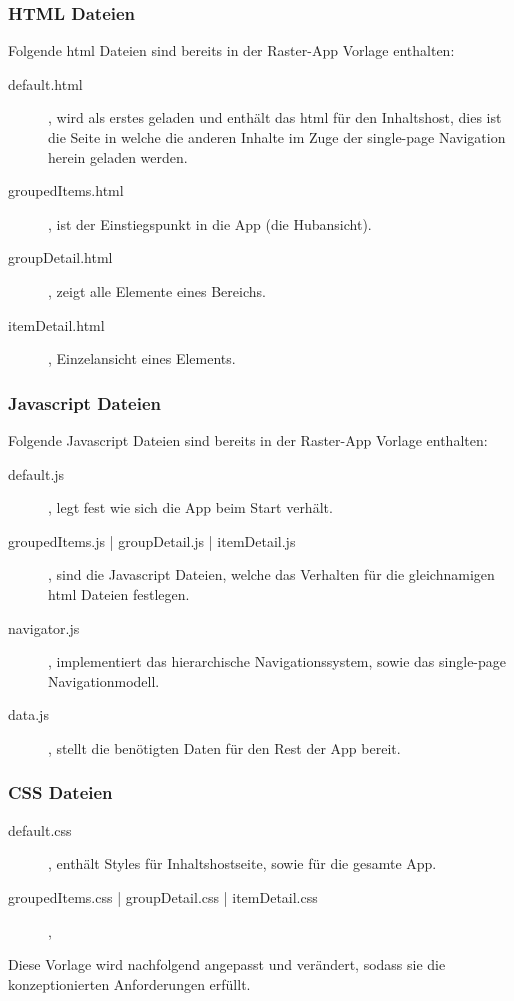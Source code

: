 \documentclass[12pt,a4paper,bibtotoc,abstracton]{scrartcl}
\begin{document}
\subsubsection{HTML Dateien}
\label{subsubsec:htmldateien} 
Folgende \ac{html} Dateien sind bereits in der Raster-App Vorlage enthalten:
\begin{description}
	\item[default.html], wird als erstes geladen und enthält das \ac{html} für den Inhaltshost, dies ist die Seite in welche die anderen Inhalte im Zuge der single-page Navigation herein geladen werden.
	\item[groupedItems.html], ist der Einstiegspunkt in die App (die Hubansicht).
	\item[groupDetail.html], zeigt alle Elemente eines Bereichs.
	\item[itemDetail.html], Einzelansicht eines Elements.
\end{description}

\subsubsection{Javascript Dateien}
\label{subsubsec:javascriptdateien} 
Folgende Javascript Dateien sind bereits in der Raster-App Vorlage enthalten:
\begin{description}
	\item[default.js], legt fest wie sich die App beim Start verhält.
	\item[groupedItems.js | groupDetail.js | itemDetail.js], sind die Javascript Dateien, welche das Verhalten für die gleichnamigen \ac{html} Dateien festlegen.
	\item[navigator.js], implementiert das hierarchische Navigationssystem, sowie das single-page Navigationmodell.
	\item[data.js], stellt die benötigten Daten für den Rest der App bereit.
\end{description}

\subsubsection{CSS Dateien}
\label{subsubsec:cssdateien} 
\begin{description}
	\item[default.css], enthält Styles für Inhaltshostseite, sowie für die gesamte App.
	\item[groupedItems.css | groupDetail.css | itemDetail.css], 
\end{description}
Diese Vorlage wird nachfolgend angepasst und verändert, sodass sie die konzeptionierten Anforderungen erfüllt.
\end{document}
